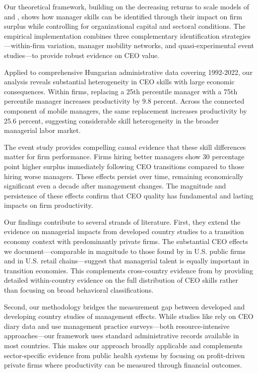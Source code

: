 \documentclass[11pt,a4paper]{article}
\begin{document}
Our theoretical framework, building on the decreasing returns to scale models of \citet{AtkesonKehoe2005JPE} and \citet{McGrattan2012RED}, shows how manager skills can be identified through their impact on firm surplus while controlling for organizational capital and sectoral conditions. The empirical implementation combines three complementary identification strategies—within-firm variation, manager mobility networks, and quasi-experimental event studies—to provide robust evidence on CEO value.

Applied to comprehensive Hungarian administrative data covering 1992-2022, our analysis reveals substantial heterogeneity in CEO skills with large economic consequences. Within firms, replacing a 25th percentile manager with a 75th percentile manager increases productivity by 9.8 percent. Across the connected component of mobile managers, the same replacement increases productivity by 25.6 percent, suggesting considerable skill heterogeneity in the broader managerial labor market.

The event study provides compelling causal evidence that these skill differences matter for firm performance. Firms hiring better managers show 30 percentage point higher surplus immediately following CEO transitions compared to those hiring worse managers. These effects persist over time, remaining economically significant even a decade after management changes. The magnitude and persistence of these effects confirm that CEO quality has fundamental and lasting impacts on firm productivity.

Our findings contribute to several strands of literature. First, they extend the evidence on managerial impacts from developed country studies to a transition economy context with predominantly private firms. The substantial CEO effects we document—comparable in magnitude to those found by \citet{Bertrand2003-io} in U.S. public firms and \citet{metcalfe2023managers} in U.S. retail chains—suggest that managerial talent is equally important in transition economies. This complements cross-country evidence from \citet{dahlstrand2025ceo} by providing detailed within-country evidence on the full distribution of CEO skills rather than focusing on broad behavioral classifications.

Second, our methodology bridges the measurement gap between developed and developing country studies of management effects. While studies like \citet{bandiera2020ceo} rely on CEO diary data and \citet{bloom2013does} use management practice surveys—both resource-intensive approaches—our framework uses standard administrative records available in most countries. This makes our approach broadly applicable and complements sector-specific evidence from public health systems \citep{janke2024role, munoz2024leadership} by focusing on profit-driven private firms where productivity can be measured through financial outcomes.
\end{document}
